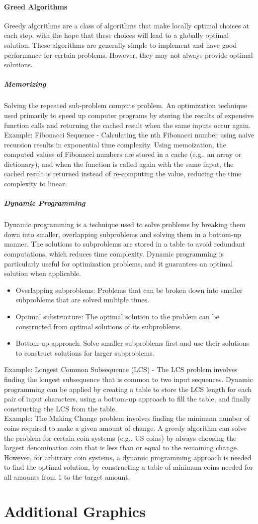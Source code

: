 \documentclass[10pt]{article}
\begin{document}
\paragraph{Greed Algorithms}
Greedy algorithms are a class of algorithms that make locally optimal choices at each step, with the hope that these choices will lead to a globally optimal solution. These algorithms are generally simple to implement and have good performance for certain problems. However, they may not always provide optimal solutions.
\subparagraph{Memorizing}
Solving the repeated sub-problem compute problem. An optimization technique used primarily to speed up computer programs by storing the results of
expensive function calls and returning the cached result when the same inputs occur again.\\
Example: Fibonacci Sequence - Calculating the nth Fibonacci number using naive recursion results in exponential time complexity. Using memoization, the computed values of Fibonacci numbers are stored in a cache (e.g., an array or dictionary), and when the function is called again with the same input, the cached result is returned instead of re-computing the value, reducing the time complexity to linear.
\subparagraph{Dynamic Programming}
Dynamic programming is a technique used to solve problems by breaking them down into smaller, overlapping subproblems and solving them in a bottom-up manner. The solutions to subproblems are stored in a table to avoid redundant computations, which reduces time complexity. Dynamic programming is particularly useful for optimization problems, and it guarantees an optimal solution when applicable.\\
\begin{itemize}
    \item Overlapping subproblems: Problems that can be broken down into smaller subproblems that are solved multiple times.
    \item Optimal substructure: The optimal solution to the problem can be constructed from optimal solutions of its subproblems.
    \item Bottom-up approach: Solve smaller subproblems first and use their solutions to construct solutions for larger subproblems.
\end{itemize}
Example: Longest Common Subsequence (LCS) - The LCS problem involves finding the longest subsequence that is common to two input sequences. Dynamic programming can be applied by creating a table to store the LCS length for each pair of input characters, using a bottom-up approach to fill the table, and finally constructing the LCS from the table.\\
Example: The Making Change problem involves finding the minimum number of coins required to make a given amount of change. A greedy algorithm can solve the problem for certain coin systems (e.g., US coins) by always choosing the largest denomination coin that is less than or equal to the remaining change. However, for arbitrary coin systems, a dynamic programming approach is needed to find the optimal solution, by constructing a table of minimum coins needed for all amounts from 1 to the target amount.

\section{Additional Graphics}
\end{document}
